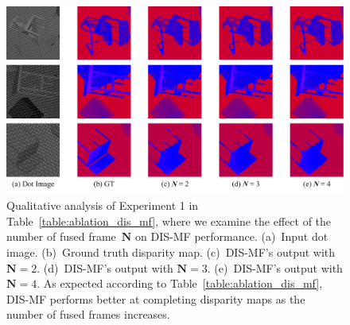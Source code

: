 \begin{figure}[t]
    \begin{center}
        \includegraphics[width=1.0\linewidth]{images/chapter2/supp_figures/ablation_mf_n.jpg}
    \end{center}
   \caption{Qualitative analysis of Experiment 1 in Table~\ref{table:ablation_dis_mf}, where we examine the effect of the number of fused frame~$\boldsymbol{N}$ on DIS-MF performance. (a)~Input dot image. (b)~Ground truth disparity map. (c)~DIS-MF's output with $\boldsymbol{N} = 2$. (d)~DIS-MF's output with $\boldsymbol{N} = 3$. (e)~DIS-MF's output with $\boldsymbol{N} = 4$. As expected according to Table~\ref{table:ablation_dis_mf}, DIS-MF performs better at completing disparity maps as the number of fused frames increases.} \label{fig:c2_ablation_mf_n}
\end{figure}

